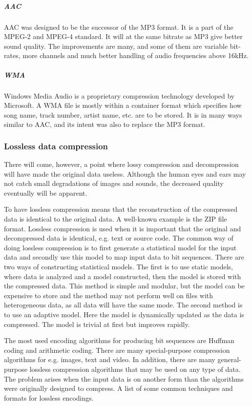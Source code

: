 \subparagraph{AAC}
AAC was designed to be the successor of the MP3 format. It is a part of the MPEG-2 and MPEG-4 standard. It will at the same bitrate as MP3 give better sound quality. The improvements are many, and some of them are variable bit-rates, more channels  and much better handling of audio frequencies above 16kHz.
\cite{bib:AAC}


\subparagraph{WMA}
Windows Media Audio is a proprietary compression technology developed by Microsoft. A WMA file is mostly within a container format which specifies how song name, track number, artist name, etc. are to be stored. It is in many ways similar to AAC, and its intent was also to replace the MP3 format.
\cite{bib:WMA}



\subsubsection{Lossless data compression}
There will come, however, a point where lossy compression and decompression will have made the original data useless. Although the human eyes and ears may not catch small degradations of images and sounds, the decreased quality eventually will be apparent.

To have lossless compression means that the reconstruction of the compressed data is identical to the original data. A well-known example is the ZIP file format. Lossless compression is used when it is important that the original and decompressed data is identical, e.g. text or source code. The common way of doing lossless compression is to first generate a statistical model for the input data and secondly use this model to map input data to bit sequences. There are two ways of constructing statistical models. The first is to use static models, where data is analyzed and a model constructed, then the model is stored with the compressed data. This method is simple and modular, but the model can be expensive to store and the method may not perform well on files with heterogeneous data, as all data will have the same mode. The second method is to use an adaptive model. Here the model is dynamically updated as the data is compressed. The model is trivial at first but improves rapidly.

The most used encoding algorithms for producing bit sequences are Huffman coding and arithmetic coding. There are many special-purpose compression algorithms for e.g. images, text and video. In addition, there are many general-purpose lossless compression algorithms that may be used on any type of data. The problem arises when the input data is on another form than the algorithms were originally designed to compress.
A list of some common techniques and formats for lossless encodings. \cite{bib:losslessCompression}


